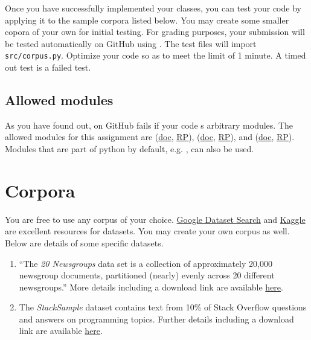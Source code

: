 \documentclass[addpoints]{exam}
\begin{document}
Once you have successfully implemented your classes, you can test your code by applying it to the sample corpora listed below. You may create some smaller copora of your own for initial testing. For grading purposes, your submission will be tested automatically on GitHub using  . The test files will import \texttt{src/corpus.py}. Optimize your code so as to meet the  limit of 1 minute. A timed out test is a failed test.

\subsection{Allowed modules}

As you have found out,  on GitHub fails if your code s arbitrary modules. The allowed modules for this assignment are  (\href{https://docs.python.org/3/library/pathlib.html}{doc}, \href{https://realpython.com/python-pathlib/}{RP}),  (\href{https://docs.python.org/3/library/zipfile.html}{doc}, \href{https://realpython.com/python-zipfile/}{RP}), and  (\href{https://www.nltk.org}{doc}, \href{https://realpython.com/nltk-nlp-python/}{RP}). Modules that are part of python by default, e.g. , can also be used.

\section{Corpora}
\label{sec:corpora}

You are free to use any corpus of your choice. \href{https://datasetsearch.research.google.com}{Google Dataset Search} and \href{https://www.kaggle.com/datasets}{Kaggle} are excellent resources for datasets. You may create your own corpus as well. Below are details of some specific datasets.
\begin{enumerate}
  \item ``The \textit{20 Newsgroups} data set is a collection of approximately 20,000 newsgroup documents, partitioned (nearly) evenly across 20 different newsgroups.'' More details including a download link are available \href{http://qwone.com/~jason/20Newsgroups/}{here}.
  \item The \textit{StackSample} dataset contains text from 10\% of Stack Overflow questions and answers on programming topics. Further details including a download link are available \href{https://www.kaggle.com/datasets/stackoverflow/stacksample?fbclid=IwAR0kFAaMfLW9DViWaRapXd6xhdGmsnM56hExLL9aVqNfOPBeLvBOxkel85g}{here}.
\end{enumerate}
\end{document}
